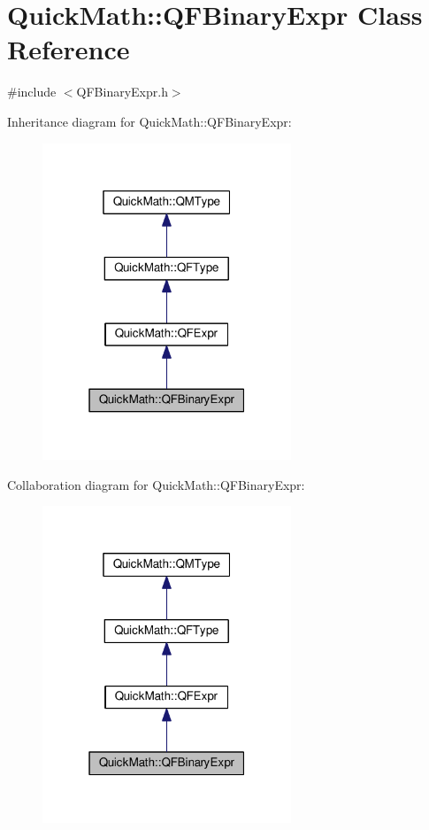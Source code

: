 \hypertarget{classQuickMath_1_1QFBinaryExpr}{}\section{Quick\+Math\+:\+:Q\+F\+Binary\+Expr Class Reference}
\label{classQuickMath_1_1QFBinaryExpr}


{\ttfamily \#include $<$Q\+F\+Binary\+Expr.\+h$>$}



Inheritance diagram for Quick\+Math\+:\+:Q\+F\+Binary\+Expr\+:
\nopagebreak
\begin{figure}[H]
\begin{center}
\leavevmode
\includegraphics[width=211pt]{classQuickMath_1_1QFBinaryExpr__inherit__graph}
\end{center}
\end{figure}


Collaboration diagram for Quick\+Math\+:\+:Q\+F\+Binary\+Expr\+:
\nopagebreak
\begin{figure}[H]
\begin{center}
\leavevmode
\includegraphics[width=211pt]{classQuickMath_1_1QFBinaryExpr__coll__graph}
\end{center}
\end{figure}

